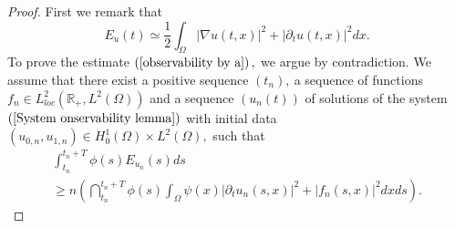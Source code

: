 \documentclass[11pt,reqno]{amsart}
\theoremstyle{plain}
\numberwithin{equation}{section}
\numberwithin{equation}{section}
\begin{document}
\begin{proof}
First we remark that 
\begin{equation*}
E_{u}\left( t\right) \simeq \frac{1}{2}\int_{\Omega }\left\vert \nabla
u\left( t,x\right) \right\vert ^{2}+\left\vert \partial _{t}u\left(
t,x\right) \right\vert ^{2}dx.
\end{equation*}%
To prove the estimate $\left( \ref{observability by a}\right) ,$ we argue by
contradiction. We assume that there exist a positive sequence $\left(
t_{n}\right) ,~$a sequence of functions $f_{n}\in L_{loc}^{2}\left( 
\mathbb{R}
_{+},L^{2}\left( \Omega \right) \right) $ and a sequence $\left( u_{n}\left(
t\right) \right) $ of solutions of the system $\left( \ref{System
onservability lemma}\right) $ with initial data $\left(
u_{0,n},u_{1,n}\right) \in H_{0}^{1}\left( \Omega \right) \times L^{2}\left(
\Omega \right) ,$ such that%
\begin{equation}
\begin{array}{l}
\int_{t_{n}}^{t_{n}+T}\phi \left( s\right) E_{u_{n}}\left( s\right) ds \\ 
\geq n\left( \dint_{t_{n}}^{t_{n}+T}\phi \left( s\right) \int_{\Omega }\psi
\left( x\right) \left\vert \partial _{t}u_{n}\left( s,x\right) \right\vert
^{2}+\left\vert f_{n}\left( s,x\right) \right\vert ^{2}dxds\right) .%
\end{array}
\label{proof lemma 1 observa bility wave contradiction}
\end{equation}


\end{proof}
\end{document}
